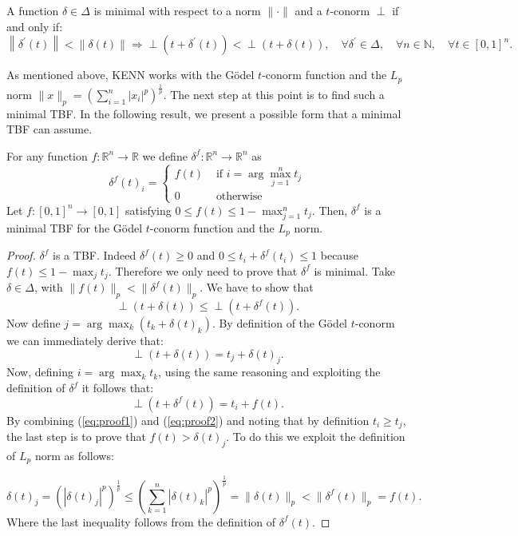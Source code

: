 \begin{definition}
	A function $\delta \in \Delta$ is minimal with respect to a norm $\|\cdot\|$ and a $t$-conorm $\perp$ if and only if:
	$$
	\left\|\delta^{\prime}(t)\right\|<\|\delta(t)\| \Rightarrow \perp\left(t+\delta^{\prime}(t)\right)<\perp(t+\delta(t)), \quad \forall \delta^{\prime} \in \Delta, \quad \forall n \in \mathbb{N}, \quad \forall t \in[0,1]^{n}.
	$$
\end{definition}

As mentioned above, KENN works with the Gödel $t$-conorm function and the $L_p$ norm $\|x\|_p = \left( \sum_{i=1}^n |x_i|^p \right)^{\frac{1}{p}}$.
The next step at this point is to find such a minimal TBF. In the following result, we present a possible form that a minimal TBF can assume.

\begin{theorem}
	\label{thm:min_tbf}
	For any function $f: \mathbb{R}^{n} \rightarrow \mathbb{R}$ we define $\delta^{f}: \mathbb{R}^{n} \rightarrow \mathbb{R}^{n}$ as
	$$
	\delta^{f}(t)_{i}= \begin{cases}f(t) & \text { if } i=\arg\max_{j=1}^n t_{j} \\ 0 & \text { otherwise }\end{cases}
	$$
	Let $f: \left[0,1\right]^{n} \rightarrow \left[0,1\right]$ satisfying $0 \leq f(t) \leq 1- \max_{j=1}^n t_j$. Then, $\delta^f$ is a minimal TBF for the Gödel $t$-conorm function and the $L_p$ norm.
\end{theorem}
\begin{proof}
	$\delta^f$ is a TBF. Indeed $\delta^f(t) \geq 0$ and $0 \leq t_i + \delta^f(t_i) \leq 1$ because $f(t) \leq 1- \max_j t_j$. Therefore we only need to prove that $\delta^f$ is minimal. Take $\delta \in \Delta$, with $\|f(t)\|_p < \|\delta^f(t)\|_p$. We have to show that $$\perp\left(t+\delta\left(t\right)\right) \leq \perp\left(t+\delta^f\left(t\right)\right).$$ 
	Now define $j=\arg\max_k \left(t_k + \delta(t)_k\right)$. By definition of the Gödel $t$-conorm we can immediately derive that:
	\begin{equation}
	\perp(t+\delta(t)) = t_j+\delta(t)_j.
	\label{eq:proof1}
	\end{equation}
	Now, defining $i=\arg\max_k t_k$, using the same reasoning and exploiting the definition of $\delta^f$ it follows that:
	\begin{equation}
	\perp(t+\delta^f(t)) = t_i + f(t).
	\label{eq:proof2}
	\end{equation}
	By combining (\ref{eq:proof1}) and (\ref{eq:proof2}) and noting that by definition $t_i \geq t_j$, the last step is to prove that $f(t) > \delta(t)_j$. To do this we exploit the definition of $L_p$ norm as follows:
	
	$$ \delta(t)_j = (|\delta(t)_j|^p)^\frac{1}{p} \leq \left(\sum_{k=1}^{n}|\delta(t)_k|^p \right)^{\frac{1}{p}} = \|\delta(t)\|_p < \|\delta^f(t)\|_p = f(t). $$ 
	Where the last inequality follows from the definition of $\delta^f(t)$.
	
\end{proof}
